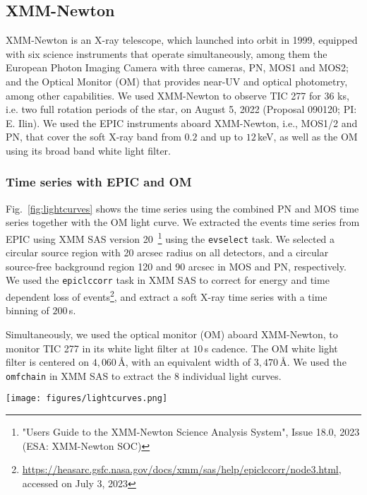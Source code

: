 \documentclass[twocolumn]{aastex631}
\begin{document}
\subsection{XMM-Newton}
\label{sec:obs:xmm}
XMM-Newton is an X-ray telescope, which launched into orbit in 1999, equipped with six science instruments that operate simultaneously, among them the European Photon Imaging Camera with three cameras, PN, MOS1 and MOS2; and the Optical Monitor (OM) that provides near-UV and optical photometry, among other capabilities.
We used XMM-Newton to observe TIC 277 for 36 ks, i.e. two full rotation periods of the star, on August 5, 2022 (Proposal 090120; PI: E. Ilin). We used the EPIC instruments aboard XMM-Newton, i.e., MOS1/2 and PN, that cover the soft X-ray band from $0.2$ and up to $12\,$keV, as well as the OM using its broad band white light filter.

\subsubsection{Time series with EPIC and OM}

Fig.~\ref{fig:lightcurves} shows the time series using the combined PN and MOS time series together with the OM light curve. We extracted the events time series from EPIC using XMM SAS version 20~\footnote{"Users Guide to the XMM-Newton Science Analysis System", Issue 18.0, 2023 (ESA: XMM-Newton SOC)} using the \texttt{evselect} task. We selected a circular source region with 20 arcsec radius on all detectors, and a circular source-free background region 120 and 90 arcsec in MOS and PN, respectively. We used the \texttt{epiclccorr} task in XMM SAS to correct for energy and time dependent loss of events\footnote{\url{https://heasarc.gsfc.nasa.gov/docs/xmm/sas/help/epiclccorr/node3.html}, accessed on July 3, 2023}, and extract a soft X-ray time series with a time binning of $200\,$s.

Simultaneously, we used the optical monitor (OM) aboard XMM-Newton, to monitor TIC 277 in its white light filter at $10$\,s cadence. The OM white light filter is centered on $4,060\,$\AA, with an equivalent width of $3,470\,$\AA. We used the \texttt{omfchain} in XMM SAS to extract the 8 individual light curves.



\begin{figure*}[ht!]
    \begin{centering}
        \texttt{[image: figures/lightcurves.png]}
        \caption{
         Top panel: Optical Monitoring (OM) light curve. Bottom panel: X-ray (PN, MOS1 and MOS2 combined) light curve. The grey shaded portion defines the flare-only subset of the observations (see Section~\ref{sec:methods:epic} and Table~\ref{tab:specfit}).
        }
        \label{fig:lightcurves}
    \end{centering}
\end{figure*}
\end{document}
